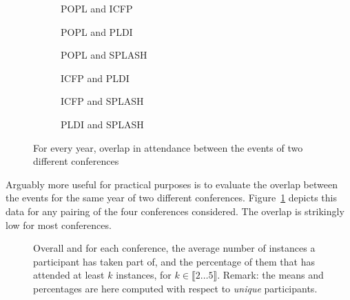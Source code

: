 
\begin{figure}
  \centering
  \begin{subfigure}[b]{0.3\textwidth}
    \centering
    \caption{POPL and ICFP}
  \end{subfigure}
  \begin{subfigure}[b]{0.3\textwidth}
    \centering
    \caption{POPL and PLDI}
  \end{subfigure}
  \begin{subfigure}[b]{0.3\textwidth}
    \centering
    \caption{POPL and SPLASH}
  \end{subfigure}
  \begin{subfigure}[b]{0.3\textwidth}
    \centering
    \caption{ICFP and PLDI}
  \end{subfigure}
  \begin{subfigure}[b]{0.3\textwidth}
    \centering
    \caption{ICFP and SPLASH}
  \end{subfigure}
  \begin{subfigure}[b]{0.3\textwidth}
    \centering
    \caption{PLDI and SPLASH}
  \end{subfigure}
   \caption{For every year, overlap in attendance between the events of two
     different conferences}
  \label{fig:overlap-cross}
\end{figure}

Arguably more useful for practical purposes is to evaluate the overlap 
between the events for the same year of two different conferences.
Figure~\ref{fig:overlap-cross} depicts this data for any pairing of the four
conferences considered. The overlap is strikingly low for most conferences.

\begin{figure}
\caption{Overall and for each conference, the average number of instances a
  participant has taken part of, and the percentage of them that has
  attended at least $k$ instances, for $k\in\llbracket 2 \dots 5
  \rrbracket$. Remark: the means and percentages are here computed with
  respect to \emph{unique} participants.  }
\label{fig:reccurent}
\end{figure}


